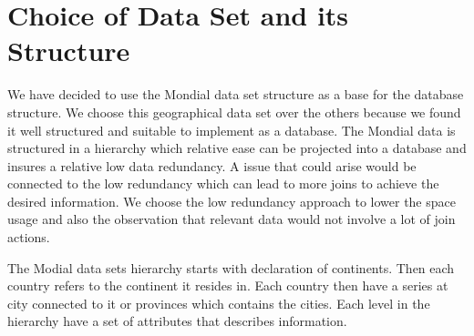 \section{Choice of Data Set and its Structure}
We have decided to use the Mondial data set structure as a base for the database structure. We choose this geographical data set over the others because we found it well structured and suitable to implement as a database. The Mondial data is structured in a hierarchy which relative ease can be projected into a database and insures a relative low data redundancy. A issue that could arise would be connected to the low redundancy which can lead to more joins to achieve the desired information. We choose the low redundancy approach to lower the space usage and also the observation that relevant data would not involve a lot of join actions.

The Modial data sets hierarchy starts with declaration of continents. Then each country refers to the continent it resides in. Each country then have a series at city connected to it or provinces which contains the cities. Each level in the hierarchy have a set of attributes that describes information.